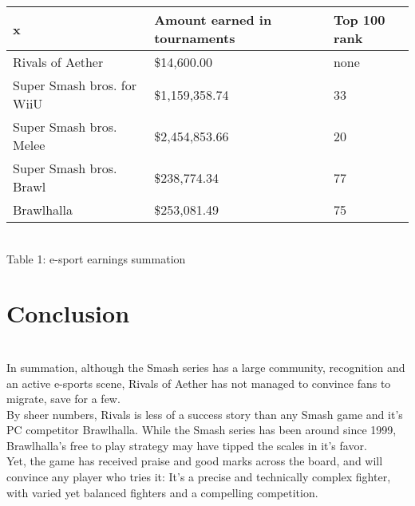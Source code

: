 \documentclass{article}
\begin{document}
\begin{center}
\begin{table}
\begin{tabular}{|l|l|l|}
\hline
x & Amount earned in tournaments & Top 100 rank \\
\hline
Rivals of Aether & \$14,600.00 & none \\
\hline
Super Smash bros. for WiiU & \$1,159,358.74 & 33\\
\hline
Super Smash bros. Melee & \$2,454,853.66 & 20\\
\hline
Super Smash bros. Brawl & \$238,774.34 & 77\\
\hline
Brawlhalla & \$253,081.49 & 75\\
\hline
\end{tabular}\\
Table 1: e-sport earnings summation\cite{esport:14}\\
\end{table}
\end{center}

\chapter{\textbf{Conclusion}}\\
In summation, although the Smash series has a large community, recognition and an active e-sports scene, Rivals of Aether has not managed to convince fans to migrate, save for a few.\\
By sheer numbers, Rivals is less of a success story than any Smash game and it's PC competitor Brawlhalla. While the Smash series has been around since 1999, Brawlhalla's free to play strategy may have tipped the scales in it's favor.\\
Yet, the game has received praise and good marks across the board, and will convince any player who tries it: It's a precise and technically complex fighter, with varied yet balanced fighters and a compelling competition.\\

\newpage


\end{document}
